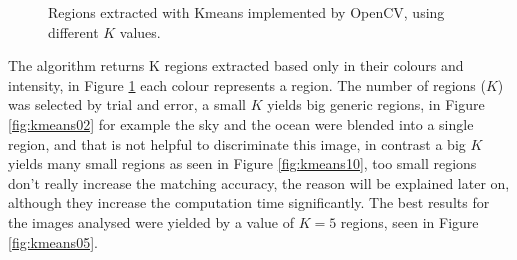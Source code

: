 \documentclass[12pt,a4paper]{article}
\begin{document}
\begin{figure}[!h]
{{			
		}
		\label{fig:kmeans08}
	}
	\quad
	\caption{Regions extracted with Kmeans implemented by OpenCV, using different $K$ values.}
	\label{fig:kmeans}
\end{figure}

	The algorithm returns K regions extracted based only in their colours and intensity, in Figure \ref{fig:kmeans} each colour represents a region. The number of regions ($K$) was selected by trial and error, a small $K$ yields big generic regions, in Figure \ref{fig:kmeans02} for example the sky and the ocean were blended into a single region, and that is not helpful to discriminate this image, in contrast a big $K$ yields many small regions as seen in Figure \ref{fig:kmeans10},  too small regions don't really increase the matching accuracy, the reason will be explained later on, although they increase the computation time significantly. The best results for the images analysed were yielded by a value of $K = 5$ regions, seen in Figure \ref{fig:kmeans05}.
	
\end{document}
